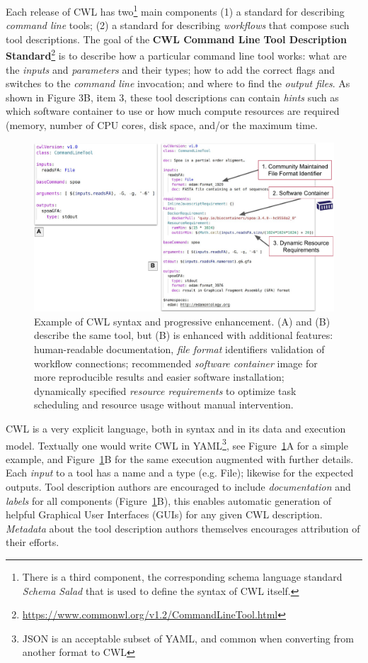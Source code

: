 \documentclass[sigconf,authordraft]{acmart}
\begin{document}
Each release of CWL has two\footnote{There is a third component, the corresponding schema language standard \textit{Schema Salad} that is used to define the syntax of CWL itself.} main components (1) a standard for describing \textit{command line} tools; (2) a standard for describing \textit{workflows} that compose such tool descriptions. The goal of the \textbf{CWL Command Line Tool Description Standard}\footnote{\url{https://www.commonwl.org/v1.2/CommandLineTool.html}} is to describe how a particular command line tool works: what are the \textit{inputs} and \textit{parameters} and their types; how to add the correct flags and switches to the \textit{command line} invocation; and where to find the \textit{output files}. As shown in Figure 3B, item 3, these tool descriptions can contain \textit{hints} such as which software container to use or how much compute resources are required (memory, number of CPU cores, disk space, and/or
the maximum time.

\begin{figure}
  \centering
  \includegraphics[width=\textwidth]{figure3}
  \caption{Example of CWL syntax and progressive enhancement. (A) and (B) describe the same tool, but (B) is enhanced with additional features: human-readable documentation, \textit{file format} identifiers validation of workflow connections; recommended \textit{software container} image for more reproducible results and easier software installation; dynamically specified \textit{resource requirements} to optimize task scheduling and resource usage without manual intervention.}
  \label{fig:syntax}
 \end{figure}

CWL is a very explicit language, both in syntax and in its data and execution model. Textually one would write CWL in YAML\footnote{JSON is an acceptable subset of YAML, and common when converting from another format to CWL}, see Figure~\ref{fig:syntax}A for a simple example, and Figure~\ref{fig:syntax}B for the same execution augmented with further details. Each \textit{input} to a tool has a name and a type (e.g. File); likewise for the expected outputs. Tool description authors are encouraged to include \textit{documentation} and \textit{labels} for all components (Figure~\ref{fig:syntax}B), this enables automatic generation of helpful Graphical User Interfaces (GUIs) for any given CWL description. \textit{Metadata} about the tool description authors themselves encourages attribution of their efforts.
\end{document}
